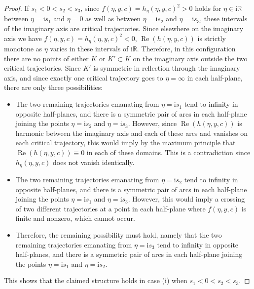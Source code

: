 \begin{proof}
If $s_1<0<s_2<s_3$, since $f(\eta,y,c)=h_\eta(\eta,y,c)^2>0$ holds for $\eta\in\mathrm{i}\mathbb{R}$ between $\eta=\mathrm{i} s_1$ and $\eta=0$ as well as between $\eta=\mathrm{i} s_2$ and $\eta=\mathrm{i} s_3$, these intervals of the imaginary axis are critical trajectories. Since elsewhere on the imaginary axis we have ${f(\eta,y,c)=h_\eta(\eta,y,c)^2<0}$, $\operatorname{Re}(h(\eta,y,c))$ is strictly monotone as $\eta$ varies in these intervals of $\mathrm{i}\mathbb{R}$. Therefore, in this configuration there are no points of either $K$ or $K'\subset K$ on the imaginary axis outside the two critical trajectories. Since $K'$ is symmetric in reflection through the imaginary axis, and since exactly one critical trajectory goes to $\eta=\infty$ in each half-plane, there are only three possibilities:
\begin{itemize}\itemsep=0pt
\item The two remaining trajectories emanating from $\eta=\mathrm{i} s_1$ tend to infinity in opposite half-planes, and there is a symmetric pair of arcs in each half-plane joining the points $\eta=\mathrm{i} s_2$ and $\eta=\mathrm{i} s_3$. However, since $\operatorname{Re}(h(\eta,y,c))$ is harmonic between the imaginary axis and each of these arcs and vanishes on each critical trajectory, this would imply by the maximum principle that $\operatorname{Re}(h(\eta,y,c))\equiv 0$ in each of these domains. This is a contradiction since $h_\eta(\eta,y,c)$ does not vanish identically.
\item The two remaining trajectories emanating from $\eta=\mathrm{i} s_2$ tend to infinity in opposite half-planes, and there is a symmetric pair of arcs in each half-plane joining the points $\eta=\mathrm{i} s_1$ and $\eta=\mathrm{i} s_3$. However, this would imply a crossing of two different trajectories at a point in each half-plane where $f(\eta,y,c)$ is finite and nonzero, which cannot occur.
\item Therefore, the remaining possibility must hold, namely that the two remaining trajectories emanating from $\eta=\mathrm{i} s_3$ tend to infinity in opposite half-planes, and there is a symmetric pair of arcs in each half-plane joining the points $\eta=\mathrm{i} s_1$ and $\eta=\mathrm{i} s_2$.
\end{itemize}
This shows that the claimed structure holds in case (i) when $s_1<0<s_2<s_3$.


\end{proof}
